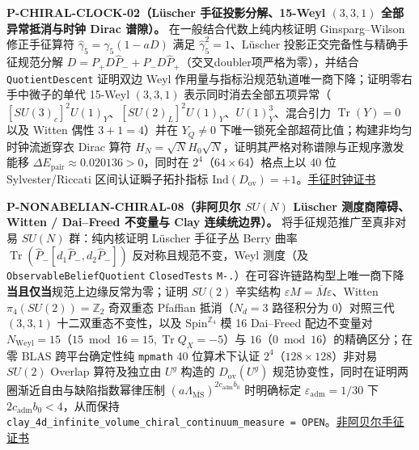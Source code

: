 \documentclass[
  11pt,
  oneside]{book}
\begin{document}
\protect\hypertarget{p-chiral-clock-02}{}{}

\textbf{P-CHIRAL-CLOCK-02（Lüscher 手征投影分解、15-Weyl \((3,3,1)\)
全部异常抵消与时钟 Dirac 谱隙）。} 在一般结合代数上纯内核证明
Ginsparg--Wilson 修正手征算符 \(\hat\gamma_5 = \gamma_5(1 - aD)\) 满足
\(\hat\gamma_5^2 = 1\)、Lüscher 投影正交完备性与精确手征规范分解
\(D = P_+ D\hat P_- + P_- D\hat P_+\)（交叉doubler项严格为零），并结合
\texttt{Quotient\allowbreak Descent} 证明双边 Weyl
作用量与指标沿规范轨道唯一商下降；证明零右手中微子的单代 15-Weyl
\((3,3,1)\)
表示同时消去全部五项异常（\([SU(3)_c]^2 U(1)_Y\)、\([SU(2)_L]^2 U(1)_Y\)、\(U(1)_Y^3\)、混合引力
\(\operatorname{Tr}(Y)=0\) 以及 Witten 偶性 \(3+1=4\)）并在
\(Y_Q \ne 0\) 下唯一锁死全部超荷比值；构建非均匀时钟流逝穿衣 Dirac 算符
\(H_N = \sqrt{N} H_0 \sqrt{N}\)，证明其严格对称谱隙与正规序激发能移
\(\Delta E_{\mathrm{pair}} \approx 0.020136 > 0\)，同时在
\(2^4\)（\(64\times 64\)）格点上以 40 位 Sylvester/Riccati
区间认证瞬子拓扑指标
\(\mathrm{Ind}(D_{\mathrm{ov}}) = +1\)。\href{../../unification/chiral_gauge_overlap_clock/certificate.json}{手征时钟证书}

\protect\hypertarget{p-nonabelian-chiral-08}{}{}

\textbf{P-NONABELIAN-CHIRAL-08（非阿贝尔 \(SU(N)\) Lüscher
测度商障碍、Witten / Dai--Freed 不变量与 Clay 连续统边界）。}
将手征规范推广至真非对易 \(SU(N)\) 群：纯内核证明 Lüscher 手征子丛 Berry
曲率 \(\operatorname{Tr}(\hat P_-[d_1 \hat P_-, d_2 \hat P_-])\)
反对称且规范不变，Weyl 测度（及 \texttt{Observable\allowbreak Belief\allowbreak Quotient}
\texttt{Closed\allowbreak Tests}
\texttt{M-.}）在可容许链路构型上唯一商下降\textbf{当且仅当}规范上边缘反常为零；证明
\(SU(2)\) 辛实结构 \(\varepsilon M = \overline{M}\varepsilon\)、Witten
\(\pi_4(SU(2))=\mathbb{Z}_2\) 奇双重态 Pfaffian 抵消（\(N_d=3\)
路径积分为 \(0\)）对照三代 \((3,3,1)\) 十二双重态不变性，以及
\(\mathrm{Spin}^{\mathbb{Z}_4}\) 模 16 Dai--Freed 配边不变量对
\(N_{\mathrm{Weyl}}=15\)（\(15 \bmod 16 = 15, \operatorname{Tr}Q_X = -5\)）与
\(16\)（\(0 \bmod 16\)）的精确区分；在零 BLAS 跨平台确定性纯
\texttt{mpmath} 40 位算术下认证 \(2^4\)（\(128\times 128\)）非对易
\(SU(2)\) Overlap 算符及独立由 \(U^g\) 构造的 \(D_{\mathrm{ov}}(U^g)\)
规范协变性，同时在证明两圈渐近自由与缺陷指数幂律压制
\((a\Lambda_{\overline{\mathrm{MS}}})^{2c_{\mathrm{adm}}b_0}\)
时明确标定 \(\varepsilon_{\mathrm{adm}}=1/30\) 下
\(2c_{\mathrm{adm}}b_0 < 4\)，从而保持
\texttt{clay\_\allowbreak 4d\_\allowbreak infinite\_\allowbreak volume\_\allowbreak chiral\_\allowbreak continuum\_\allowbreak measure\ =\ OPEN}。\href{../../unification/nonabelian_chiral_constructive/certificate.json}{非阿贝尔手征证书}
\end{document}
